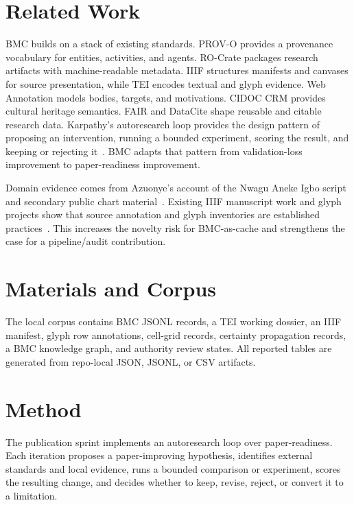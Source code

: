 \documentclass[manuscript]{acmart}
\begin{document}
\section{Related Work}
BMC builds on a stack of existing standards. PROV-O provides a provenance vocabulary for entities, activities, and agents. RO-Crate packages research artifacts with machine-readable metadata. IIIF structures manifests and canvases for source presentation, while TEI encodes textual and glyph evidence. Web Annotation models bodies, targets, and motivations. CIDOC CRM provides cultural heritage semantics. FAIR and DataCite shape reusable and citable research data. Karpathy's autoresearch loop provides the design pattern of proposing an intervention, running a bounded experiment, scoring the result, and keeping or rejecting it~\cite{karpathy_autoresearch}. BMC adapts that pattern from validation-loss improvement to paper-readiness improvement.

Domain evidence comes from Azuonye's account of the Nwagu Aneke Igbo script~\cite{azuonye_nwagu_1992} and secondary public chart material~\cite{omniglot_nwagu}. Existing IIIF manuscript work and glyph projects show that source annotation and glyph inventories are established practices~\cite{iiif_leonardo_2022,nahua_glyphs,rongorongo_platform}. This increases the novelty risk for BMC-as-cache and strengthens the case for a pipeline/audit contribution.

\section{Materials and Corpus}
The local corpus contains BMC JSONL records, a TEI working dossier, an IIIF manifest, glyph row annotations, cell-grid records, certainty propagation records, a BMC knowledge graph, and authority review states. All reported tables are generated from repo-local JSON, JSONL, or CSV artifacts.



\section{Method}
The publication sprint implements an autoresearch loop over paper-readiness. Each iteration proposes a paper-improving hypothesis, identifies external standards and local evidence, runs a bounded comparison or experiment, scores the resulting change, and decides whether to keep, revise, reject, or convert it to a limitation.
\end{document}

